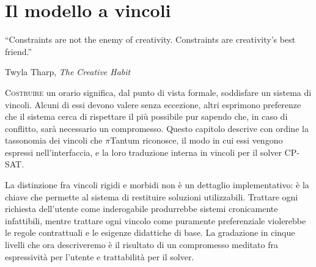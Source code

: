 \chapter{Il modello a vincoli}
\label{ch:vincoli}


\epigraph{``Constraints are not the enemy of creativity. Constraints
are creativity's best friend.''}{Twyla Tharp,
\emph{The Creative Habit}}

\lettrine[lines=3]{C}{ostruire} un orario significa, dal
punto di vista formale, soddisfare un sistema di vincoli.
Alcuni di essi devono valere senza eccezione, altri esprimono
preferenze che il sistema cerca di rispettare il pi\`u
possibile pur sapendo che, in caso di conflitto, sar\`a
necessario un compromesso. Questo capitolo descrive con
ordine la tassonomia dei vincoli che $\pi$Tantum riconosce,
il modo in cui essi vengono espressi nell'interfaccia, e la
loro traduzione interna in vincoli per il solver CP-SAT.

La distinzione fra vincoli rigidi e morbidi non \`e un
dettaglio implementativo: \`e la chiave che permette al
sistema di restituire soluzioni utilizzabili. Trattare ogni
richiesta dell'utente come inderogabile produrrebbe sistemi
cronicamente infattibili, mentre trattare ogni vincolo come
puramente preferenziale violerebbe le regole contrattuali e
le esigenze didattiche di base. La gradazione in cinque
livelli che ora descriveremo \`e il risultato di un
compromesso meditato fra espressivit\`a per l'utente e
trattabilit\`a per il solver.


